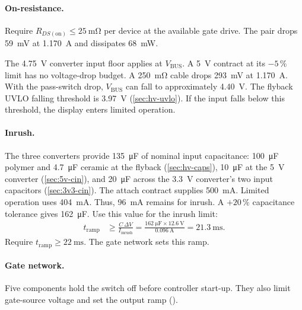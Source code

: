 \paragraph{On-resistance.} Require
$R_{DS(\mathrm{on})}\leq\SI{25}{\milli\ohm}$ per device at the available gate
drive. The pair drops \SI{59}{\milli\volt} at \SI{1.170}{\ampere} and
dissipates \SI{68}{\milli\watt}.

The \SI{4.75}{\volt} converter input floor applies at $V_{\mathrm{BUS}}$. A
\SI{5}{\volt} contract at its $-5\,\%$ limit has no voltage-drop budget. A
\SI{250}{\milli\ohm} cable drops \SI{293}{\milli\volt} at
\SI{1.170}{\ampere}. With the pass-switch drop, $V_{\mathrm{BUS}}$ can fall to
approximately \SI{4.40}{\volt}. The flyback UVLO falling threshold is
\SI{3.97}{\volt} (\cref{sec:hv-uvlo}). If the input falls below this threshold,
the display enters limited operation.

\paragraph{Inrush.} The three converters provide \SI{135}{\micro\farad} of
nominal input capacitance: \SI{100}{\micro\farad} polymer and
\SI{4.7}{\micro\farad} ceramic at the flyback (\cref{sec:hv-caps}),
\SI{10}{\micro\farad} at the 5~V converter (\cref{sec:5v-cin}), and
\SI{20}{\micro\farad} across the 3.3~V converter's two input capacitors
(\cref{sec:3v3-cin}). The attach contract supplies
\SI{500}{\milli\ampere}. Limited operation uses \SI{404}{\milli\ampere}.
Thus, \SI{96}{\milli\ampere} remains for inrush. A $+20\,\%$ capacitance
tolerance gives \SI{162}{\micro\farad}. Use this value for the inrush limit:
\begin{align*}
  t_{\mathrm{ramp}} &\geq \frac{C\,\Delta V}{I_{\mathrm{inrush}}}
    = \frac{\SI{162}{\micro\farad}\times\SI{12.6}{\volt}}{\SI{0.096}{\ampere}}
    = \SI{21.3}{\milli\second}.
\end{align*}
Require $t_{\mathrm{ramp}}\geq\SI{22}{\milli\second}$. The gate network sets
this ramp.

\paragraph{Gate network.} Five components hold the switch off before controller
start-up. They also limit gate-source voltage and set the output ramp
().


